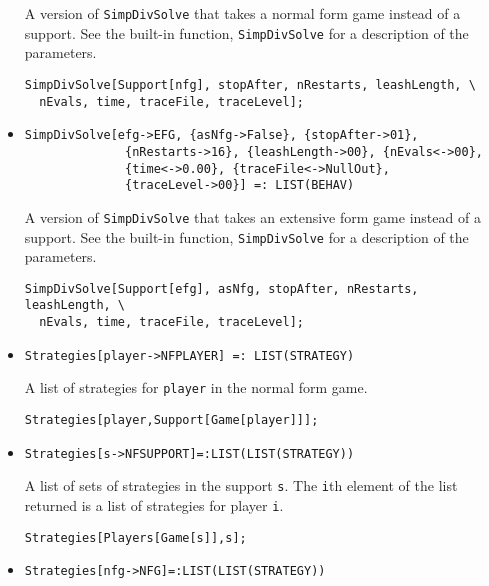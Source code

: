 \begin{itemize}
\bd 
A version of \verb+SimpDivSolve+ that takes a normal form
game instead of a support.  See the built-in function,
\verb+SimpDivSolve+ for a description of the parameters.
\begin{verbatim}
SimpDivSolve[Support[nfg], stopAfter, nRestarts, leashLength, \
  nEvals, time, traceFile, traceLevel];
\end{verbatim} 
\ed

\item{}
\protect \large \begin{verbatim}
SimpDivSolve[efg->EFG, {asNfg->False}, {stopAfter->01}, 
              {nRestarts->16}, {leashLength->00}, {nEvals<->00}, 
              {time<->0.00}, {traceFile<->NullOut}, 
              {traceLevel->00}] =: LIST(BEHAV)
\end{verbatim}\normalsize

\bd 
A version of \verb+SimpDivSolve+ that takes an extensive form
game instead of a support.  See the built-in function,
\verb+SimpDivSolve+ for a description of the parameters.
\begin{verbatim}
SimpDivSolve[Support[efg], asNfg, stopAfter, nRestarts, leashLength, \
  nEvals, time, traceFile, traceLevel];
\end{verbatim} 
\ed

\item{}
\protect \large \begin{verbatim}
Strategies[player->NFPLAYER] =: LIST(STRATEGY)
\end{verbatim}\normalsize

\bd 
A list of strategies for \verb+player+ in the normal form game.  
\begin{verbatim}
Strategies[player,Support[Game[player]]];
\end{verbatim} 
\ed

\item{}
\protect \large \begin{verbatim}
Strategies[s->NFSUPPORT]=:LIST(LIST(STRATEGY))
\end{verbatim}\normalsize

\bd 
A list of sets of strategies in the support \verb+s+. The \verb+i+th
element of the list returned is a list of strategies for player
\verb+i+.   
\begin{verbatim}
Strategies[Players[Game[s]],s];
\end{verbatim} 
\ed


\item{}
\protect \large \begin{verbatim}
Strategies[nfg->NFG]=:LIST(LIST(STRATEGY))
\end{verbatim}\normalsize


\end{itemize}
